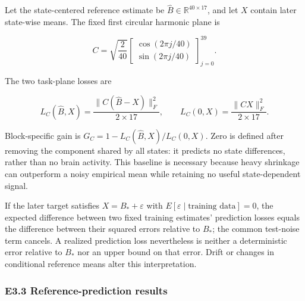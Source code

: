 \documentclass[11pt,a4paper]{article}
\begin{document}
Let the state-centered reference estimate be
\(\widehat B\in\mathbb R^{40\times17}\), and let \(X\) contain later
state-wise means. The fixed first circular harmonic plane is

\[
C=\sqrt{\frac{2}{40}}
\begin{bmatrix}
\cos(2\pi j/40)\\
\sin(2\pi j/40)
\end{bmatrix}_{j=0}^{39}.
\]

The two task-plane losses are

\[
L_C(\widehat B,X)=\frac{\|C(\widehat B-X)\|_F^2}{2\times17},
\qquad L_C(0,X)=\frac{\|CX\|_F^2}{2\times17}.
\]

Block-specific gain is \(G_C=1-L_C(\widehat B,X)/L_C(0,X)\). Zero is
defined after removing the component shared by all states: it predicts
no state differences, rather than no brain activity. This baseline is
necessary because heavy shrinkage can outperform a noisy empirical mean
while retaining no useful state-dependent signal.

If the later target satisfies \(X=B_*+\varepsilon\) with
\(E[\varepsilon\mid\text{training data}]=0\), the expected difference
between two fixed training estimates' prediction losses equals the
difference between their squared errors relative to \(B_*\); the common
test-noise term cancels. A realized prediction loss nevertheless is
neither a deterministic error relative to \(B_*\) nor an upper bound on
that error. Drift or changes in conditional reference means alter this
interpretation.

\subsubsection{E3.3 Reference-prediction
results}\label{e3.3-reference-prediction-results}


\begingroup
\small
\end{document}

